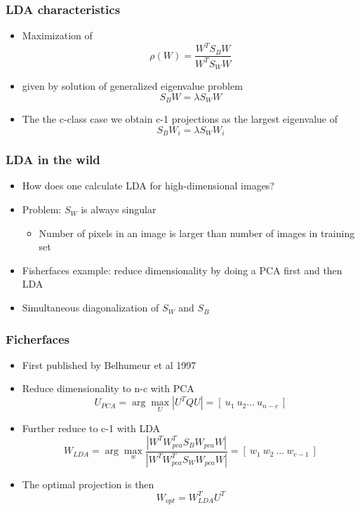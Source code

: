 \documentclass[10pt]{beamer}
\begin{document}
\begin{frame}
  \frametitle{LDA characteristics}
  \begin{itemize}
  \item Maximization of
    \[
      \rho (W) = \frac{W^T S_B W}{W^T S_W W}
    \]
  \item given by solution of generalized eigenvalue problem
    \[
      S_B W = \lambda S_W W
    \]
  \item The the c-class case we obtain c-1 projections as the largest eigenvalue of
    \[
      S_B W_i = \lambda S_W W_i
    \]
  \end{itemize}
\end{frame}

\begin{frame}
  \frametitle{LDA in the wild}
  \begin{itemize}
  \item How does one calculate LDA for high-dimensional images? 
  \item Problem: $S_W$ is always singular
    \begin{itemize}
    \item Number of pixels in an image is larger than number of images in training set
    \end{itemize}
  \item Fisherfaces example: reduce dimensionality by doing a PCA first and then LDA
  \item Simultaneous diagonalization of $S_W$ and $S_B$
  \end{itemize}
\end{frame}

\begin{frame}
  \frametitle{Ficherfaces}
  \begin{itemize}
  \item First published by Belhumeur et al 1997
  \item Reduce dimensionality to n-c with PCA
    \[
      U_{PCA} = \arg \max_U | U^T Q U | = [~u_1 ~ u_2 \ldots ~ u_{n-c} ~]
    \]
  \item Further reduce to c-1 with LDA
    \[
      W_{LDA} = \arg \max_w \frac{| W^T W^T_{pca} S_B W_{pca} W |}{| W^T W^T_{pca} S_W W_{pca} W |} =
      [~ w_1 ~ w_2 ~ \ldots ~ w_{c-1} ~]
    \]
  \item The optimal projection is then
    \[
      W_{opt} = W_{LDA}^T U^T
    \]
  \end{itemize}
\end{frame}
\end{document}
